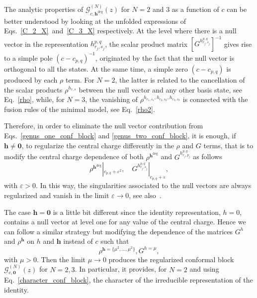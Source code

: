 \documentclass[a4paper,11pt]{article}
\begin{document}
The analytic properties of $\mathcal{G}_{c, \boldsymbol{h}^{\text{deg}}}^{(N)}(z)$ for $N=2$ and $3$ as a function of $c$ can be better understood by looking at the unfolded expressions of Eqs.~\eqref{C_2_X}~and~\eqref{C_3_X} respectively. At the level where there is a null vector in the representation $h_{r_j, s_j}^{p, q}$, the scalar product matrix $\left[G^{h^{p,q}_{r_j,s_j}}\right]^{-1}$ gives rise to a simple pole $(c-c_{p, q})^{-1}$, originated by the fact that the null vector is orthogonal to all the states.  At the same time, a simple zero $(c-c_{p,q})$ is produced by each $\rho$ term. For $N=2$, the latter is related to the cancellation of the scalar products $\rho^{h_{r,s}}$ between the null vector and any other basis state, see Eq.~\eqref{rho}, while, for $N= 3$, the vanishing of $\rho^{h_{r_1,s_1},h_{r_2,s_2},h_{r_3,s_3}}$ is connected with the fusion rules of the minimal model, see Eq.~\eqref{rho2}.  

Therefore, in order to eliminate the null vector contribution from Eqs.~\eqref{genus_one_conf_block} and \eqref{genus_two_conf_block}, 
it is enough, if $\boldsymbol{h}\neq \boldsymbol{0}$, to regularize the central charge differently in the $\rho$ and $G$ terms, 
that is to modify the central charge dependence of both $\rho^{\boldsymbol{h}^{\text{deg}}}$ and $G^{h_{r_j, p_j}^{p, q}}$ as follows
\begin{equation}\label{regularization}
 \rho^{\boldsymbol{h}^{\text{deg}}}|_{c_{p,q}+\varepsilon^2},\quad  G^{h_{r_j, s_j}^{p, q}}|_{c_{p,q}+\varepsilon},
\end{equation}
with $\varepsilon>0$. In this way, the singularities associated to the null vectors are always regularized and vanish 
in the limit $\varepsilon\to 0$, see also~\cite{SV, Alkalaev}. 

The case $\boldsymbol{h}=\boldsymbol{0}$ is a little bit different since the identity representation,
$h=0$, contains a null vector at level one for any value of the central charge. Hence we can follow 
a similar strategy but modifying the dependence of the matrices $G^{h}$ and $\rho^{\boldsymbol{h}}$
on $h$ and $\boldsymbol{h}$ instead of $c$ such that
\begin{equation}\label{regularization_identity}
 \rho^{\boldsymbol{h}=\{\mu^2,\dots, \mu^2\}}, G^{h=\mu},
\end{equation}
with $\mu>0$. Then the limit $\mu\to 0$ produces the regularized conformal block 
$\mathcal{G}_{c, \boldsymbol{0}}^{(N)}(z)$ for $N=2,3$. In particular, it provides, 
for $N=2$ and using Eq.~\eqref{character_conf_block}, the  character of the irreducible 
representation of the identity.
\end{document}

